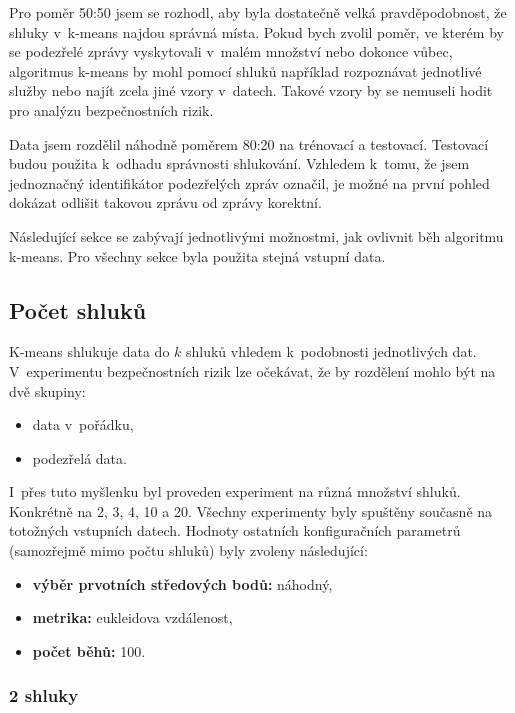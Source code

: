 \documentclass[thesis=M,czech]{FITthesis}[2012/10/20]
\begin{document}
		Pro poměr 50:50 jsem se rozhodl, aby byla dostatečně velká pravděpodobnost, že shluky v~k-means najdou správná místa. Pokud bych zvolil poměr, ve kterém by se podezřelé zprávy vyskytovali v~malém množství nebo dokonce vůbec, algoritmus k-means by mohl pomocí shluků například rozpoznávat jednotlivé služby nebo najít zcela jiné vzory v~datech. Takové vzory by se nemuseli hodit pro analýzu bezpečnostních rizik.
		
		Data jsem rozdělil náhodně poměrem 80:20 na trénovací a testovací. Testovací budou použita k~odhadu správnosti shlukování. Vzhledem k~tomu, že jsem jednoznačný identifikátor podezřelých zpráv označil, je možné na první pohled dokázat odlišit takovou zprávu od zprávy korektní.
		
		Následující sekce se zabývají jednotlivými možnostmi, jak ovlivnit běh algoritmu k-means. Pro všechny sekce byla použita stejná vstupní data.

		\subsection{Počet shluků}
			K-means shlukuje data do $k$ shluků vhledem k~podobnosti jednotlivých dat. V~experimentu bezpečnostních rizik lze očekávat, že by rozdělení mohlo být na dvě skupiny:
			
			\begin{itemize} 
				\item data v~pořádku,
				\item podezřelá data.	
			\end{itemize}
		
			I~přes tuto myšlenku byl proveden experiment na různá množství shluků. Konkrétně na 2, 3, 4, 10 a 20. Všechny experimenty byly spuštěny současně na totožných vstupních datech. Hodnoty ostatních konfiguračních parametrů (samozřejmě mimo počtu shluků) byly zvoleny následující:
			
			\begin{itemize} 
				\item \textbf{výběr prvotních středových bodů: } náhodný,
				\item \textbf{metrika: } eukleidova vzdálenost,
				\item \textbf{počet běhů: } 100.	
			\end{itemize}
				
				\subsubsection{2 shluky}
				
\end{document}
